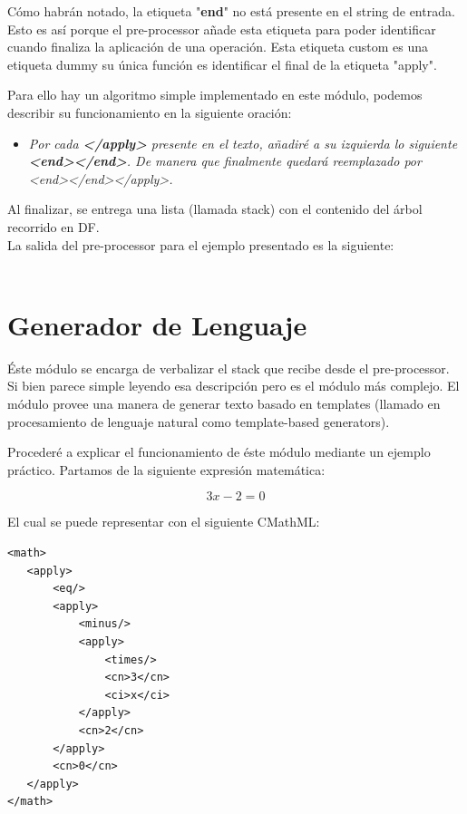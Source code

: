 Cómo habrán notado, la etiqueta "\textbf{end}" no está presente en el string de entrada. Esto es así porque el pre-processor añade esta etiqueta para poder identificar cuando finaliza la aplicación de una operación.
Esta etiqueta custom es una etiqueta dummy su única función es identificar el final de la etiqueta "apply".

Para ello hay un algoritmo simple implementado en este módulo, podemos describir su funcionamiento en la siguiente oración:

\begin{itemize}
\item \textit{Por cada \textbf{</apply>} presente en el texto, añadiré a su izquierda lo siguiente \textbf{<end></end>}. De manera que finalmente quedará reemplazado por <end></end></apply>.}
\end{itemize}

Al finalizar, se entrega una lista (llamada stack) con el contenido del árbol recorrido en DF.\\[0.01cm]

La salida del pre-processor para el ejemplo presentado es la siguiente:\\[0.01cm]

\\[0.01cm]


\section{Generador de Lenguaje}

Éste módulo se encarga de verbalizar el stack que recibe desde el pre-processor. Si bien parece simple leyendo esa descripción pero es el módulo más complejo. El módulo provee una manera de generar texto basado en templates (llamado en procesamiento de lenguaje natural como template-based generators).

Procederé a explicar el funcionamiento de éste módulo mediante un ejemplo práctico. Partamos de la siguiente expresión matemática:

$$3x - 2 = 0$$

El cual se puede representar con el siguiente CMathML:

\lstset{language=XML}
\begin{lstlisting}
<math>
   <apply>
       <eq/>
       <apply>
           <minus/>
           <apply>
               <times/>
               <cn>3</cn>
               <ci>x</ci>
           </apply>
           <cn>2</cn>
       </apply>
       <cn>0</cn>
   </apply>
</math>
\end{lstlisting}

